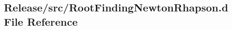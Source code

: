 \hypertarget{RootFindingNewtonRhapson_8d}{
\subsection{Release/src/RootFindingNewtonRhapson.d File Reference}
\label{RootFindingNewtonRhapson_8d}
}
